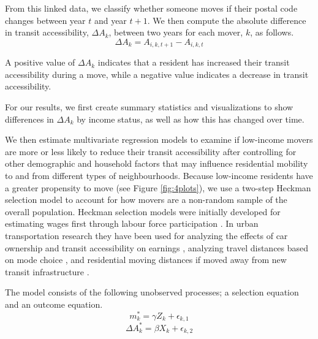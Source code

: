 From this linked data, we classify whether someone moves if their postal code changes between year $t$ and year $t + 1$. We then compute the absolute difference in transit accessibility, $\Delta A_{k}$, between two years for each mover, $k$, as follows.
\begin{equation}
\Delta A_{k} = A_{i,k,t + 1} - A_{i,k,t}
\end{equation}

A positive value of $\Delta A_{k}$ indicates that a resident has increased their transit accessibility during a move, while a negative value indicates a decrease in transit accessibility. 

For our results, we first create summary statistics and visualizations to show differences in $\Delta A_{k}$ by income status, as well as how this has changed over time. 

We then estimate multivariate regression models to examine if low-income movers are more or less likely to reduce their transit accessibility after controlling for other demographic and household factors that may influence residential mobility to and from different types of neighbourhoods. Because low-income residents have a greater propensity to move (see Figure \ref{fig:4plots}), we use a two-step Heckman selection model to account for how movers are a non-random sample of the overall population. Heckman selection models were initially developed for estimating wages first through labour force participation \cite{heckman_shadow_1974}. In urban transportation research they have been used for analyzing the effects of car ownership and transit accessibility on earnings \cite{smart_disentangling_2020}, analyzing travel distances based on mode choice \cite{kaplan_walking_2016}, and residential moving distances if moved away from new transit infrastructure \cite{chu_impacts_2017}.

The model consists of the following unobserved processes; a selection equation and an outcome equation.
\begin{equation}
m_k^* = \gamma Z_k  + \epsilon_{k,1}
\end{equation}
\begin{equation}
\Delta A_{k}^* = \beta X_{k} + \epsilon_{k,2}
\end{equation}

